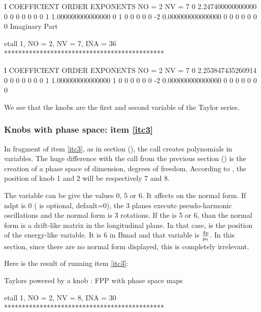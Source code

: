 \documentclass{hitec}     %
\begin{document}
{{{{{{\begin{code}
    I  COEFFICIENT          ORDER   EXPONENTS
      NO =     2      NV =     7
   0   2.247400000000000       0  0  0  0  0  0  0
   1   1.000000000000000       0  1  0  0  0  0  0
    -2   0.000000000000000       0  0  0  0  0  0  0
  Imaginary Part

 etall    1, NO =    2, NV =    7, INA =   36
 *********************************************

    I  COEFFICIENT          ORDER   EXPONENTS
      NO =     2      NV =     7
   0   2.253847435260914       0  0  0  0  0  0  0
   1   1.000000000000000       1  0  0  0  0  0  0
    -2   0.000000000000000       0  0  0  0  0  0  0
\end{code}
\renewcommand{\codefont}{\small}

We see that the knobs are the first and second variable of the Taylor series.

\subsubsection{Knobs with phase space: item \ref{itc3}}
\label{s:initwithps}

In fragment of item \ref{itc3},  as in section (), the call  creates polynomials in  variables. The huge difference with the call from the previous section () is the creation of a phase space of   dimension,   degrees of freedom.  According to , the position of knob 1 and 2 will be respectively 7 and 8.

The variable  can be give the values 0, 5 or 6. It affects on the normal form. If ndpt is 0 ( is optional, default=0), the 3 planes execute pseudo-harmonic oscillations and the normal form is 3 rotations. If the  is 5 or 6, than the normal form is a drift-like matrix in the longitudinal plane. In that case,  is the position of the energy-like variable. It is 6 in Bmad and that variable is $\delta p \over p_0$. In this section, since there are no normal form displayed, this is completely irrelevant. 

Here is the result of running item \ref{itc3}:

\renewcommand{\codefont}{\footnotesize}
\begin{code}
 Taylors powered by a knob : FPP with phase space maps

 etall    1, NO =    2, NV =    8, INA =   30
 *********************************************


\end{code}}}}}}}
\end{document}

